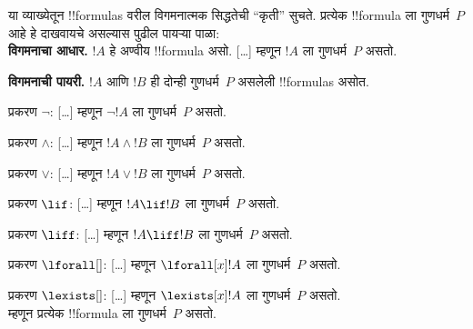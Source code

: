 \documentclass[../../include/open-logic-section]{subfiles}
\begin{document}
\begin{explain}
या व्याख्येतून !!{formula}s वरील विगमनात्मक सिद्धतेची
“कृती” सुचते. प्रत्येक !!{formula} ला गुणधर्म~$P$
आहे हे दाखवायचे असल्यास पुढील पायऱ्या पाळा:\\

\textbf{विगमनाचा आधार.} $!A$ हे अण्वीय
!!{formula} असो. [\ldots] म्हणून $!A$ ला गुणधर्म~$P$ असतो.

\textbf{विगमनाची पायरी.} $!A$ आणि $!B$ ही दोन्ही
गुणधर्म~$P$ असलेली !!{formula}s असोत.

प्रकरण $\lnot$: [\ldots] म्हणून $\lnot !A$ ला गुणधर्म~$P$ असतो.

प्रकरण $\land$: [\ldots] म्हणून $!A \land !B$ ला गुणधर्म~$P$ असतो.

प्रकरण $\lor$: [\ldots] म्हणून $!A \lor !B$ ला गुणधर्म~$P$ असतो.

प्रकरण $\lif$: [\ldots] म्हणून $!A \lif !B$ ला गुणधर्म~$P$ असतो.

प्रकरण $\liff$: [\ldots] म्हणून $!A \liff !B$ ला गुणधर्म~$P$ असतो.

प्रकरण $\lforall[]$: [\ldots] म्हणून $\lforall[x] !A$ ला गुणधर्म~$P$ असतो.

प्रकरण $\lexists[]$: [\ldots] म्हणून $\lexists[x] !A$ ला गुणधर्म~$P$ असतो. \\

म्हणून प्रत्येक !!{formula} ला गुणधर्म~$P$ असतो.
\end{explain}
\end{document}
